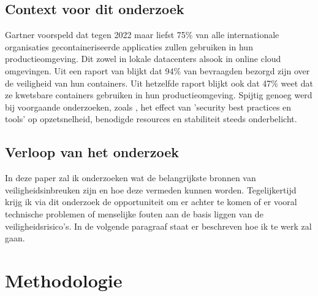 \subsection{Context voor dit onderzoek}
Gartner \autocite{Gartner2019} voorspeld dat tegen 2022 maar liefst 75\% van alle internationale organisaties gecontaineriseerde
applicaties zullen gebruiken in hun productieomgeving. Dit zowel in lokale datacenters alsook in online cloud omgevingen. 
Uit een raport van \textcite{Tripwire2019} blijkt dat 94\% van bevraagden bezorgd zijn over de veiligheid van hun containers. 
Uit hetzelfde raport blijkt ook dat 47\% weet dat ze kwetsbare containers gebruiken in hun productieomgeving. 
Spijtig genoeg werd bij voorgaande onderzoeken, zoals \textcite{StackRox2020}, het effect van 'security best practices en tools' 
op opzetsnelheid, benodigde resources en stabiliteit steeds onderbelicht. 

\subsection{Verloop van het onderzoek}
In deze paper zal ik onderzoeken wat de belangrijkste bronnen van veiligheidsinbreuken zijn en hoe deze vermeden kunnen worden. 
Tegelijkertijd krijg ik via dit onderzoek de opportuniteit om er achter te komen of er vooral technische problemen of menselijke fouten aan de basis liggen van de veiligheidsrisico's. 
In de volgende paragraaf staat er beschreven hoe ik te werk zal gaan. 

\section{Methodologie}
\label{sec:methodologie}

